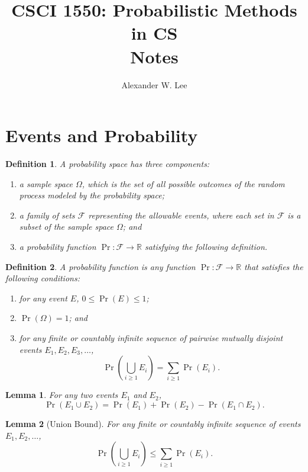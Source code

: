 \documentclass{amsart}
\title{CSCI 1550: Probabilistic Methods in CS \\ \small{Notes}}
\author{Alexander W. Lee}
\newtheorem*{definition}{Definition}
\newtheorem*{lemma}{Lemma}
\newcommand{\R}{\mathbb{R}}
\begin{document}
\maketitle

\section{Events and Probability}

\begin{definition}
  A probability space has three components:
  \begin{enumerate}
    \item a sample space $\Omega$, which is the set of all possible outcomes of
      the random process modeled by the probability space;
    \item a family of sets $\mathcal{F}$ representing the allowable events,
      where each set in $\mathcal{F}$ is a subset of the sample space $\Omega$;
      and
    \item a probability function $\Pr: \mathcal{F} \to \R$ satisfying the
      following definition.
  \end{enumerate}
\end{definition}

\begin{definition}
  A probability function is any function $\Pr: \mathcal{F} \to \R$ that
  satisfies the following conditions:
  \begin{enumerate}
    \item for any event $E$, $0 \leq \Pr(E) \leq 1$;
    \item $\Pr(\Omega) = 1$; and
    \item for any finite or countably infinite sequence of pairwise mutually
      disjoint events $E_1, E_2, E_3, \ldots$,
      \[
        \Pr \left( \bigcup_{i \geq 1} E_i \right) = \sum_{i \geq 1} \Pr(E_i).
      \]
  \end{enumerate}
\end{definition}

\begin{lemma}
  For any two events $E_1$ and $E_2$,
  \[
    \Pr(E_1 \cup E_2) = \Pr(E_1) + \Pr(E_2) - \Pr(E_1 \cap E_2).
  \]
\end{lemma}

\begin{lemma}[Union Bound]
  For any finite or countably infinite sequence of events $E_1, E_2, \ldots$,
  \[
    \Pr \left( \bigcup_{i \geq 1} E_i \right) \leq \sum_{i \geq 1} \Pr(E_i).
  \]
\end{lemma}
\end{document}
